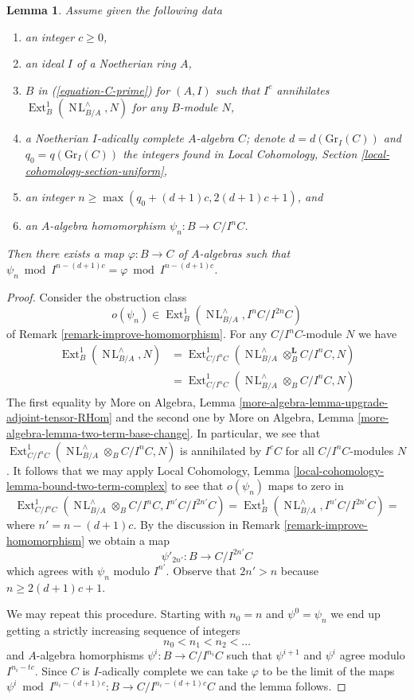 \documentclass[10pt,a4paper]{amsart}
\theoremstyle{plain}
\newtheorem{lemma}[subsection]{Lemma}
\theoremstyle{definition}
\theoremstyle{remark}
\numberwithin{equation}{subsection}
\def\Ext{\mathop{\mathrm{Ext}}\nolimits}
\def\NL{\mathop{N\!L}\nolimits}
\begin{document}
\begin{lemma}
\label{lemma-get-morphism-general-better}
Assume given the following data
\begin{enumerate}
\item an integer $c \geq 0$,
\item an ideal $I$ of a Noetherian ring $A$,
\item $B$ in (\ref{equation-C-prime}) for $(A, I)$ such that
$I^c$ annihilates $\Ext^1_B(\NL_{B/A}^\wedge, N)$
for any $B$-module $N$,
\item a Noetherian $I$-adically complete $A$-algebra $C$; denote
$d = d(\text{Gr}_I(C))$ and $q_0 = q(\text{Gr}_I(C))$ the integers found in
Local Cohomology, Section \ref{local-cohomology-section-uniform},
\item an integer $n \geq \max(q_0 + (d + 1)c, 2(d + 1)c + 1)$, and
\item an $A$-algebra homomorphism $\psi_n : B \to C/I^nC$.
\end{enumerate}
Then there exists a map $\varphi : B \to C$ of $A$-algebras such
that $\psi_n \bmod I^{n - (d + 1)c} = \varphi \bmod I^{n - (d + 1)c}$.
\end{lemma}

\begin{proof}
Consider the obstruction class
$$
o(\psi_n) \in \Ext^1_B(\NL_{B/A}^\wedge, I^nC/I^{2n}C)
$$
of Remark \ref{remark-improve-homomorphism}. For any $C/I^nC$-module
$N$ we have
\begin{align*}
\Ext^1_B(\NL_{B/A}^\wedge, N)
& =
\Ext^1_{C/I^nC}(\NL_{B/A}^\wedge \otimes_B^\mathbf{L} C/I^nC, N) \\
& =
\Ext^1_{C/I^nC}(\NL_{B/A}^\wedge \otimes_B C/I^nC, N)
\end{align*}
The first equality by
More on Algebra, Lemma \ref{more-algebra-lemma-upgrade-adjoint-tensor-RHom}
and the second one by
More on Algebra, Lemma \ref{more-algebra-lemma-two-term-base-change}.
In particular, we see that
$\Ext^1_{C/I^nC}(\NL_{B/A}^\wedge \otimes_B C/I^nC, N)$ is annihilated by
$I^cC$ for all $C/I^nC$-modules $N$.
It follows that we may apply
Local Cohomology, Lemma \ref{local-cohomology-lemma-bound-two-term-complex}
to see that $o(\psi_n)$ maps to zero in
$$
\Ext^1_{C/I^nC}(\NL_{B/A}^\wedge \otimes_B C/I^nC, I^{n'}C/I^{2n'}C) =
\Ext^1_B(\NL_{B/A}^\wedge, I^{n'}C/I^{2n'}C) =
$$
where $n' = n - (d + 1)c$. By the discussion in
Remark \ref{remark-improve-homomorphism} we obtain a map
$$
\psi'_{2n'} : B \to C/I^{2n'}C
$$
which agrees with $\psi_n$ modulo $I^{n'}$.
Observe that $2n' > n$ because $n \geq 2(d + 1)c + 1$.

\medskip\noindent
We may repeat this procedure. Starting with $n_0 = n$ and
$\psi^0 = \psi_n$ we end up getting a strictly increasing
sequence of integers
$$
n_0 < n_1 < n_2 < \ldots
$$
and $A$-algebra homorphisms $\psi^i : B \to C/I^{n_i}C$
such that $\psi^{i + 1}$ and $\psi^i$ agree modulo $I^{n_i - tc}$.
Since $C$ is $I$-adically complete we can take $\varphi$
to be the limit of the maps
$\psi^i \bmod I^{n_i - (d + 1)c} : B \to C/I^{n_i - (d + 1)c}C$
and the lemma follows.
\end{proof}
\end{document}
